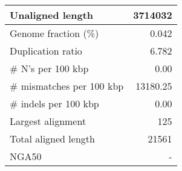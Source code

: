\documentclass[12pt,a4paper]{article}
\begin{document}
\begin{table}[ht]
\begin{center}
\begin{tabular}{|l*{1}{|r}|}
Unaligned length & 3714032 \\ \hline
Genome fraction (\%) & 0.042 \\ \hline
Duplication ratio & 6.782 \\ \hline
\# N's per 100 kbp & 0.00 \\ \hline
\# mismatches per 100 kbp & 13180.25 \\ \hline
\# indels per 100 kbp & 0.00 \\ \hline
Largest alignment & 125 \\ \hline
Total aligned length & 21561 \\ \hline
NGA50 & - \\ \hline
\end{tabular}
\end{center}
\end{table}
\end{document}
